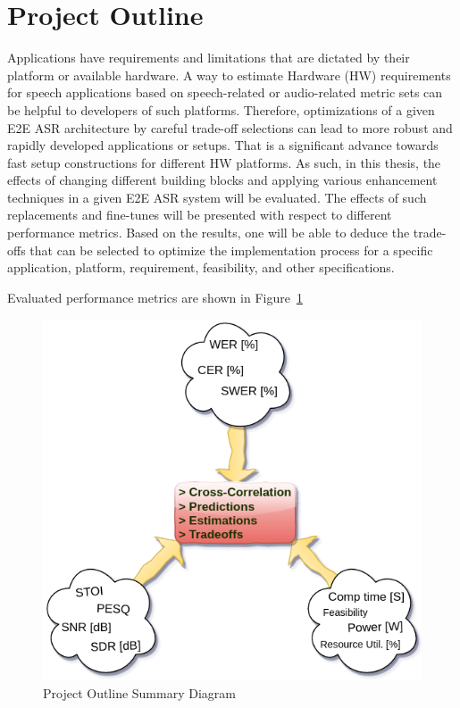 
\section{Project Outline}
Applications have requirements and limitations
that are dictated by their platform or available hardware.
A way to estimate Hardware (HW) requirements for speech
applications based on speech-related or audio-related metric sets
can be helpful to developers of such platforms.
Therefore, optimizations of a given E2E ASR architecture by careful
trade-off selections can lead to more robust and rapidly
developed applications or setups.
That is a significant advance towards fast setup constructions for different HW platforms.
As such, in this thesis, the effects of changing different
building blocks and applying various enhancement techniques
in a given E2E ASR system will be evaluated.
The effects of such replacements and
fine-tunes will be presented with respect to different
performance metrics. Based on the results, one will be able to deduce the trade-offs
that can be selected to optimize the implementation process for a specific
application, platform, requirement, feasibility, and other specifications.

\bigskip

Evaluated performance metrics
are shown in Figure~\ref{fig:metrics_cross_blocks}

\begin{figure}[H]
    \centering
    \includegraphics[width=0.75\linewidth]{Introduction/images/metrics_cross_blocks}
    \caption{Project Outline Summary Diagram}\label{fig:metrics_cross_blocks}
\end{figure}

